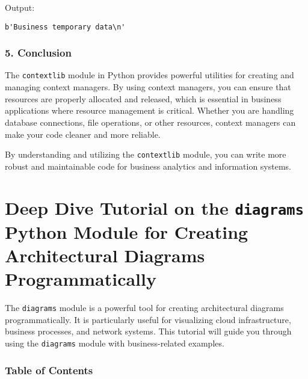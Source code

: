 \documentclass[
  letterpaper,
  DIV=11,
  numbers=noendperiod]{scrreprt}
\begin{document}
Output:

\begin{verbatim}
b'Business temporary data\n'
\end{verbatim}

\subsection{5. Conclusion}\label{conclusion-28}

The \texttt{contextlib} module in Python provides powerful utilities for
creating and managing context managers. By using context managers, you
can ensure that resources are properly allocated and released, which is
essential in business applications where resource management is
critical. Whether you are handling database connections, file
operations, or other resources, context managers can make your code
cleaner and more reliable.

By understanding and utilizing the \texttt{contextlib} module, you can
write more robust and maintainable code for business analytics and
information systems.


\chapter{\texorpdfstring{Deep Dive Tutorial on the \texttt{diagrams}
Python Module for Creating Architectural Diagrams
Programmatically}{Deep Dive Tutorial on the diagrams Python Module for Creating Architectural Diagrams Programmatically}}\label{deep-dive-tutorial-on-the-diagrams-python-module-for-creating-architectural-diagrams-programmatically}

The \texttt{diagrams} module is a powerful tool for creating
architectural diagrams programmatically. It is particularly useful for
visualizing cloud infrastructure, business processes, and network
systems. This tutorial will guide you through using the
\texttt{diagrams} module with business-related examples.

\subsection{Table of Contents}\label{table-of-contents-16}
\end{document}
